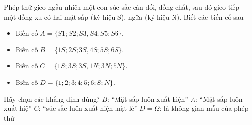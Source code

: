 \begin{ex}%
	Phép thử gieo ngẫu nhiên một con súc sắc cân đối, đồng chất, sau đó  gieo tiếp một đồng xu có hai mặt sấp (ký hiệu S), ngữa (ký hiệu N). Biết các biến cố sau
	\begin{itemize}
		\item Biến cố  $A=\{S1;S2;S3,S4;S5;S6\}$.
		\item  Biến cố $B=\{1S;2S;3S,4S;5S;6S\}$.
		 \item Biến cố $C=\{1S;3S;3S,1N;3N;5N\}$.
		\item  Biến cố $D=\{1;2;3;4;5;6;S;N\}$.
	\end{itemize}
	Hãy chọn các khẳng định đúng? 
	 \choiceTF
		 {\True $B$: ``Mặt sấp luôn xuất hiện''}
		{$A$: ``Mặt sấp luôn xuất hiệ''} 
		 {\True $C$: ``súc sắc luôn xuất hiện mặt lẻ''}
		{$D=\Omega$: là  không gian mẫu của phép thử}
\end{ex}

